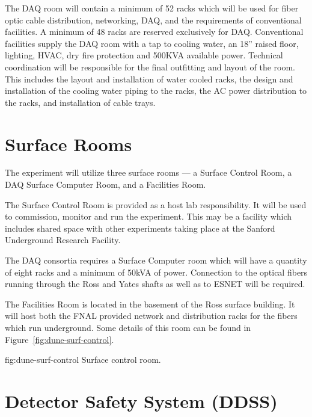 The DAQ room will contain a minimum of 52 racks which will be used for
fiber optic cable distribution, networking,  DAQ, and the
requirements of conventional facilities.  A minimum of 48 racks are
reserved exclusively for DAQ.  Conventional facilities supply the DAQ
room with a tap to cooling water, an 18'' raised floor, lighting,
HVAC, dry fire protection and 500KVA available power.  Technical
coordination will be responsible for the final outfitting and layout
of the room.  This includes the layout and installation of water
cooled racks, the design and installation of the cooling water piping
to the racks, the AC power distribution to the racks, and installation
of cable trays.



\section{Surface Rooms}
\label{sec:fdsp-coord-surf-rooms}

The  experiment will utilize three surface rooms --- a Surface
Control Room, a DAQ Surface Computer Room, and a Facilities Room.

The  Surface Control Room is provided as a host lab
responsibility.  It will be used to commission, monitor and run the
experiment.  This may be a facility which includes shared space with
other experiments taking place at the Sanford Underground Research
Facility.

The DAQ consortia requires a Surface Computer room which will have a
quantity of eight racks and a minimum of 50kVA of power.  Connection
to the optical fibers running through the Ross and Yates shafts as
well as to ESNET will be required.

The Facilities Room is located in the basement of the Ross surface
building.  It will host both the FNAL provided network and
distribution racks for the fibers which run underground. Some details
of this room can be found in Figure~\ref{fig:dune-surf-control}.
\begin{dunefigure}{fig:dune-surf-control}
  {Surface control room.}
\end{dunefigure}

\section{ Detector Safety System (DDSS)}
\label{sec:fdsp-coord-det-safety}

